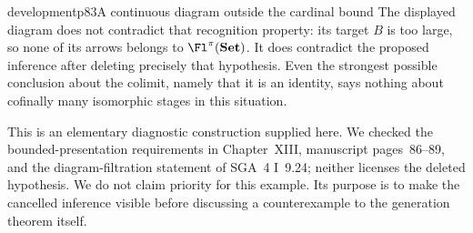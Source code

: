 \begin{dcomment}{development}{p83}{A continuous diagram outside the cardinal bound}
The displayed diagram does not contradict that recognition property: its target $B$ is too large, so none of its arrows belongs to $\Fl^\pi(\mathbf{Set})$. It does contradict the proposed inference after deleting precisely that hypothesis. Even the strongest possible conclusion about the colimit, namely that it is an identity, says nothing about cofinally many isomorphic stages in this situation.

This is an elementary diagnostic construction supplied here. We checked the bounded-presentation requirements in Chapter~XIII, manuscript pages~86--89, and the diagram-filtration statement of SGA~4 I~9.24; neither licenses the deleted hypothesis. We do not claim priority for this example. Its purpose is to make the cancelled inference visible before discussing a counterexample to the generation theorem itself.
\end{dcomment}

